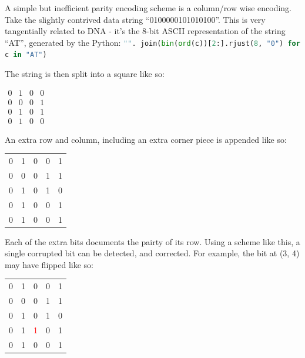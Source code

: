 \documentclass{article}
\begin{document}
    A simple but inefficient parity encoding scheme is a column/row wise
    encoding. Take the slightly contrived data string ``0100000101010100''.
    This is very tangentially related to DNA - it's the 8-bit ASCII
    representation of the string ``AT'', generated by the Python:
    \lstinline[language=Python]|"". join(bin(ord(c))[2:].rjust(8, "0") for c in "AT")|


    The string is then split into a square like so:

    \begin{center}
    \begin{math}
    \begin{matrix}
        0 & 1 & 0 & 0 \\
        0 & 0 & 0 & 1 \\
        0 & 1 & 0 & 1 \\
        0 & 1 & 0 & 0
    \end{matrix}
    \end{math}
    \end{center}

    An extra row and column, including an extra corner piece is appended like
    so:

    \begin{center}
    \begin{tabular}{c c c c | c}
        0 & 1 & 0 & 0 & 1 \\
        0 & 0 & 0 & 1 & 1 \\
        0 & 1 & 0 & 1 & 0 \\
        0 & 1 & 0 & 0 & 1 \\ \hline
        0 & 1 & 0 & 0 & 1
   \end{tabular}
   \end{center}

   Each of the extra bits documents the pairty of its row. Using a scheme like
   this, a single corrupted bit can be detected, and corrected. For example,
   the bit at (3, 4) may have flipped like so:

    \begin{center}
    \begin{tabular}{c c c c | c}
        0 & 1 & 0 & 0 & 1 \\
        0 & 0 & 0 & 1 & 1 \\
        0 & 1 & 0 & 1 & 0 \\
        0 & 1 & \textcolor{red}{1} & 0 & 1 \\ \hline
        0 & 1 & 0 & 0 & 1
   \end{tabular}
   \end{center}
\end{document}
